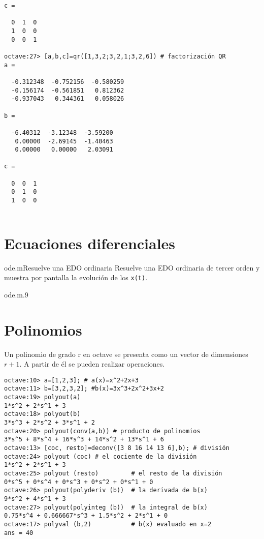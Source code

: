 \begin{verbatim}
c =

  0  1  0
  1  0  0
  0  0  1

octave:27> [a,b,c]=qr([1,3,2;3,2,1;3,2,6]) # factorización QR
a =

  -0.312348  -0.752156  -0.580259
  -0.156174  -0.561851   0.812362
  -0.937043   0.344361   0.058026

b =

  -6.40312  -3.12348  -3.59200
   0.00000  -2.69145  -1.40463
   0.00000   0.00000   2.03091

c =

  0  0  1
  0  1  0
  1  0  0


\end{verbatim}


\section{Ecuaciones diferenciales}


\begin{ejemplo}{ode.m}{Resuelve una EDO ordinaria}
Resuelve una EDO ordinaria de tercer orden y muestra por pantalla
la evolución de los {\tt x(t)}.
\end{ejemplo}

\begin{figura}{ode.m}{.9}
\caption{Resolución numérica de EDO}
\end{figura}

\section{Polinomios}


Un  polinomio de  grado r  en  octave se  presenta como  un vector  de
dimensiones $r+1$. A partir de él se pueden realizar operaciones.

\begin{verbatim}
octave:10> a=[1,2,3]; # a(x)=x^2+2x+3
octave:11> b=[3,2,3,2]; #b(x)=3x^3+2x^2+3x+2
octave:19> polyout(a)
1*s^2 + 2*s^1 + 3
octave:18> polyout(b)
3*s^3 + 2*s^2 + 3*s^1 + 2
octave:20> polyout(conv(a,b)) # producto de polinomios
3*s^5 + 8*s^4 + 16*s^3 + 14*s^2 + 13*s^1 + 6
octave:13> [coc, resto]=deconv([3 8 16 14 13 6],b); # división
octave:24> polyout (coc) # el cociente de la división
1*s^2 + 2*s^1 + 3
octave:25> polyout (resto)         # el resto de la división
0*s^5 + 0*s^4 + 0*s^3 + 0*s^2 + 0*s^1 + 0
octave:26> polyout(polyderiv (b))  # la derivada de b(x)
9*s^2 + 4*s^1 + 3
octave:27> polyout(polyinteg (b))  # la integral de b(x)
0.75*s^4 + 0.666667*s^3 + 1.5*s^2 + 2*s^1 + 0
octave:17> polyval (b,2)           # b(x) evaluado en x=2
ans = 40
\end{verbatim}

